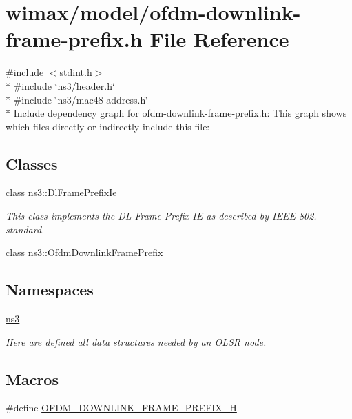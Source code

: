 \hypertarget{ofdm-downlink-frame-prefix_8h}{}\section{wimax/model/ofdm-\/downlink-\/frame-\/prefix.h File Reference}
\label{ofdm-downlink-frame-prefix_8h}
{\ttfamily \#include $<$stdint.\+h$>$}\\*
{\ttfamily \#include \char`\"{}ns3/header.\+h\char`\"{}}\\*
{\ttfamily \#include \char`\"{}ns3/mac48-\/address.\+h\char`\"{}}\\*
Include dependency graph for ofdm-\/downlink-\/frame-\/prefix.h\+:
This graph shows which files directly or indirectly include this file\+:
\subsection*{Classes}
\begin{DoxyCompactItemize}
\item 
class \hyperlink{classns3_1_1DlFramePrefixIe}{ns3\+::\+Dl\+Frame\+Prefix\+Ie}
\begin{DoxyCompactList}\small\item\em This class implements the DL Frame Prefix IE as described by I\+E\+E\+E-\/802. standard. \end{DoxyCompactList}\item 
class \hyperlink{classns3_1_1OfdmDownlinkFramePrefix}{ns3\+::\+Ofdm\+Downlink\+Frame\+Prefix}
\end{DoxyCompactItemize}
\subsection*{Namespaces}
\begin{DoxyCompactItemize}
\item 
 \hyperlink{namespacens3}{ns3}
\begin{DoxyCompactList}\small\item\em Here are defined all data structures needed by an O\+L\+SR node. \end{DoxyCompactList}\end{DoxyCompactItemize}
\subsection*{Macros}
\begin{DoxyCompactItemize}
\item 
\#define \hyperlink{ofdm-downlink-frame-prefix_8h_a05b8cf924a2828d6a22431f0aaf1b01b}{O\+F\+D\+M\+\_\+\+D\+O\+W\+N\+L\+I\+N\+K\+\_\+\+F\+R\+A\+M\+E\+\_\+\+P\+R\+E\+F\+I\+X\+\_\+H}
\end{DoxyCompactItemize}



